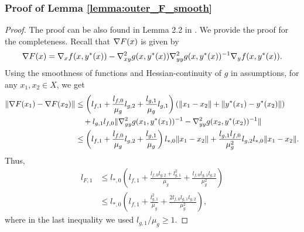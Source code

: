 \subsubsection{Proof of Lemma \ref{lemma:outer_F_smooth}}
\begin{proof}
    The proof can be also found in Lemma 2.2 in \cite{ghadimi2018approximation}. We provide the proof for the completeness. Recall that $\nabla F(x)$ is given by
    \begin{align*}
        \nabla F(x) = \nabla_x f(x,y^*(x)) - \nabla_{xy}^2 g(x,y^*(x)) \nabla_{yy}^2 g(x,y^*(x))^{-1} \nabla_y f(x,y^*(x)).
    \end{align*}
    Using the smoothness of functions and Hessian-continuity of $g$ in assumptions, for any $x_1, x_2 \in X$, we get
    \begin{align*}
        \|\nabla F(x_1) - \nabla F(x_2)\| &\le \left(l_{f,1}  + \frac{l_{f,0}}{\mu_g} l_{g,2} + \frac{l_{g,1}}{\mu_g} l_{g,1} \right) (\|x_1 - x_2\| + \|y^*(x_1) - y^*(x_2)\|) \\
        &\quad + l_{g,1} l_{f,0} \| \nabla_{yy}^2 g(x_1, y^*(x_1))^{-1} -  \nabla_{yy}^2 g(x_2, y^*(x_2))^{-1} \| \\
        &\le \left(l_{f,1}  + \frac{l_{f,0}}{\mu_g} l_{g,2} + \frac{l_{g,1}}{\mu_g}\right) l_{*,0} \|x_1 - x_2\|  + \frac{l_{g,1}l_{f,0}}{\mu_g^2} l_{g,2} l_{*,0} \|x_1 - x_2\|.
    \end{align*}
    Thus, 
    \begin{align*}
        l_{F,1} &\le l_{*,0} \left(l_{f,1} + \frac{l_{f,0} l_{g,2} + l_{g,1}^2}{\mu_g} + \frac{l_{f,0}l_{g,1}l_{g,2}}{\mu_g^2} \right) \\
        &\le l_{*,0} \left(l_{f,1} + \frac{l_{g,1}^2}{\mu_g} + \frac{2l_{f,0}l_{g,1}l_{g,2}}{\mu_g^2} \right),
    \end{align*}
    where in the last inequality we used $l_{g,1}/\mu_g \ge 1$.
\end{proof}



















